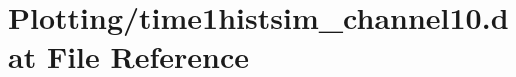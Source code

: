 \hypertarget{Plotting_2time1histsim__channel10_8dat}{}\section{Plotting/time1histsim\+\_\+channel10.dat File Reference}
\label{Plotting_2time1histsim__channel10_8dat}
